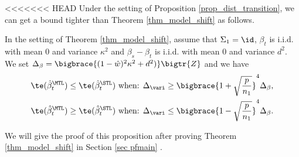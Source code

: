 



<<<<<<< HEAD
Under the setting of Proposition \ref{prop_dist_transition}, we can get a bound tighter than Theorem \ref{thm_model_shift} as follows.

	\begin{proposition}\label{prop_model_shift_tight}
		In the setting of Theorem \ref{thm_model_shift}, assume that $\Sigma_1 =\id$,
		$\beta_t$ is i.i.d. with mean $0$ and variance $\kappa^2$ and $\beta_s - \beta_t$ is i.i.d. with mean $0$ and variance $d^2$.
		We set $\Delta_{\beta} = \bigbrace{(1 - \hat{w})^2 \kappa^2 + d^2)} \bigtr{Z}$
		and we have
		\begin{align*}
			\te(\hat{\beta}_t^{\MTL}) \le \te(\hat{\beta}_t^{\STL}) \text{ when: } & \Delta_{\vari} \ge \bigbrace{1 + \sqrt{\frac{p}{n_1}}}^4 \Delta_{\beta}, \\
			\te(\hat{\beta}_t^{\MTL}) \ge \te(\hat{\beta}_t^{\STL}) \text{ when: } & \Delta_{\vari} \le \bigbrace{1 - \sqrt{\frac{p}{n_1}}}^4 \Delta_{\beta}.
		\end{align*}
	\end{proposition}
We will give the proof of this proposition after proving Theorem \ref{thm_model_shift} in Section \ref{sec pfmain}	.

